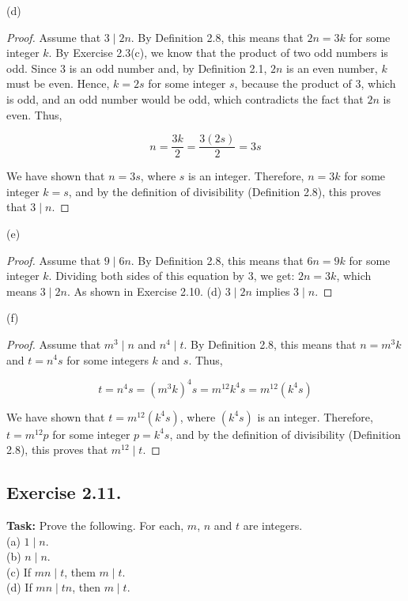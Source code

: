 \documentclass{article}
\begin{document}
\noindent (d) 

\begin{proof}
    Assume that \( 3 \mid 2n \). By Definition 2.8, this means that \( 2n = 3k \) for some integer \( k \). By Exercise 2.3(c), we know that the product of two odd numbers is odd. Since 3 is an odd number and, by Definition 2.1, \( 2n \) is an even number, \( k \) must be even. Hence, \( k = 2s \) for some integer \( s \), because the product of 3, which is odd, and an odd number would be odd, which contradicts the fact that \( 2n \) is even. Thus,
    
    \[
    n = \frac{3k}{2} = \frac{3(2s)}{2} = 3s
    \]
    
    We have shown that \( n = 3s \), where \( s \) is an integer. Therefore, \( n = 3k \) for some integer \( k = s \), and by the definition of divisibility (Definition 2.8), this proves that \( 3 \mid n \).
\end{proof}

\noindent (e)

\begin{proof}
     Assume that \( 9 \mid 6n \). By Definition 2.8, this means that \( 6n = 9k \) for some integer \( k \). Dividing both sides of this equation by 3, we get: $2n=3k$, which means $3 \mid 2n$. As shown in Exercise 2.10. (d) $3 \mid 2n$ implies $3 \mid n$.
\end{proof}

\noindent (f)

\begin{proof}
    Assume that  $m^3 \mid n$ and $n^4 \mid t$. By Definition 2.8, this means that $n=m^3k$ and $t=n^4s$ for some integers $k$ and $s$.
    Thus,

    \[t=n^4s=(m^3k)^4s=m^{12}k^4s=m^{12}(k^4s)\]

    We have shown that \( t = m^{12}(k^4s)\), where \( (k^4s) \) is an integer. Therefore, \( t = m^{12}p \) for some integer \( p = k^4s \), and by the definition of divisibility (Definition 2.8), this proves that \( m^{12} \mid t \).
\end{proof}

\newpage

\subsection{Exercise 2.11.}
\textbf{Task:} Prove the following. For each, $m$, $n$ and $t$ are integers.\\
(a) $1 \mid n$.\\
(b) $n \mid n$.\\
(c) If $mn \mid t$, them $m \mid t$.\\
(d) If $mn \mid tn$, then $m \mid t$.
\end{document}
